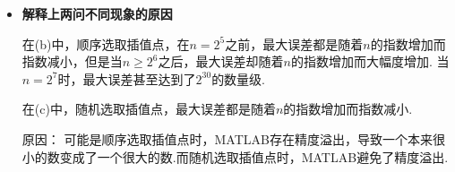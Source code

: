 \documentclass[12pt,a4paper,utf8]{ctexart}
\begin{document}
\begin{enumerate}
\begin{itemize}
  \par
  这里，我的Newton插值的MATLAB代码如下所示；
  \begin{lstlisting}[frame=single]
% use Newton interpolation to approximate a function
% @F: the function to approximate in [-1,1]
% @n_list: stores the number of points to be inserted
% @k: number of testing points in [-1,1]
% @rand: whether to randomly choose the sequence of
%   interpolation points(1) or not(0).
% plot the semilogy of max error on each n in n_list
function Newton_interpolation(F, n_list, k,rand)

    % max_errors stores the max error 
    % of testing points on each n
    [~,n_list_col] = size(n_list);
    max_errors = zeros(1,n_list_col);
    
    % get the max_error on each n
    for index = 1 : n_list_col
        
        n = n_list(index);
        % get the sequence of interpolation points
        % { ( x(i),f(x(i)) ) }
        if(rand == 1)
            rng(22);
            x0 = randperm(n + 1);
            x0 = x0 - 1;
            x0 = x0 *(pi/n);
        else
            x0 = linspace(0, pi, n + 1);
        end
        x = cos(x0);
        f = F(x);
    
        % u is the list of testing points
        u = linspace(-1, 1, k);
        % fu is the exact function value
        % of each testing points
        fu = F(u);
        % Nu is the approximation function value
        % of each testing points
        Nu = u;
         
        % g is difference of each order
        g = f;
        for i = 2 : n + 1
            for j = n + 1 : -1: i
                g(j) = (g(j) - g(j-1)) ...
                        / (x(j) - x(j-i+1)); 
            end
        end
        
        % get the approximate value of each testing point
        for i = 1 : k
            % init the parameter t 
            % and interpolation value newton
            t = 1;
            newton = g(1);
            for j = 2 : n + 1
                t = t * ( u(i) - x(j-1) );
                newton = newton + t * g(j); 
            end
            Nu(i) = newton;
        end
        max_errors(index) = max( abs(fu - Nu) );
    end
    
    semilogy(n_list,max_errors);
end

  \end{lstlisting}

  \item [(d)] \textbf{解释上两问不同现象的原因}
  \par
  在(b)中，顺序选取插值点，在$n = 2^5$之前，最大误差都是随着$n$的指数增加而指数减小，但是当$n \geq 2^6$之后，最大误差却随着$n$的指数增加而大幅度增加. 当$n = 2^7$时，最大误差甚至达到了$2^30$的数量级.
  \par
  在(c)中，随机选取插值点，最大误差都是随着$n$的指数增加而指数减小.
  \par
  原因： 可能是顺序选取插值点时，MATLAB存在精度溢出，导致一个本来很小的数变成了一个很大的数.而随机选取插值点时，MATLAB避免了精度溢出.
\end{itemize}


\end{enumerate}
\end{document}
